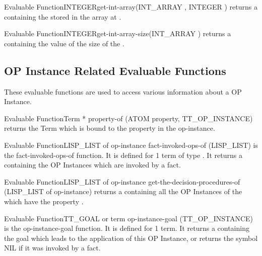 \begin{typeefa}{Evaluable Function}{INTEGER}{get-int-array}{(INT\_ARRAY
, INTEGER )}
returns a  containing the   stored in the array
 at  . 
\end{typeefa}

\begin{typeefa}{Evaluable Function}{INTEGER}{get-int-array-size}{(INT\_ARRAY
)}
returns a  containing the  value of the size of
the .
\end{typeefa}

\subsection{OP Instance Related Evaluable Functions}

These evaluable functions are used to access various information about a OP Instance.

\begin{typeefa}{Evaluable Function}{Term *} {property-of} {(ATOM property, TT\_OP\_INSTANCE)} 
returns the Term which is bound to the property  in the
op-instance. 
\end{typeefa}

\begin{typeefa}{Evaluable Function}{LISP\_LIST of op-instance} {fact-invoked-ops-of}
{(LISP\_LIST)}  
is the fact-invoked-ops-of function. It is defined for 1 term of type
. It returns a  containing the OP Instances
which are invoked by a fact. 
\end{typeefa}

\begin{typeefa}{Evaluable Function}{LISP\_LIST of op-instance}
{get-the-decision-procedures-of} {(LISP\_LIST of op-instance)} 
returns a  containing all the OP Instances of the
 which have the property  .
\end{typeefa}

\begin{typeefa}{Evaluable Function}{TT\_GOAL or term} {op-instance-goal} {(TT\_OP\_INSTANCE)}
is the op-instance-goal function. It is defined for 1 term. It returns a
 containing the goal which leads to the application of this OP
Instance, or returns the symbol NIL if it was invoked by a fact.
\end{typeefa}

